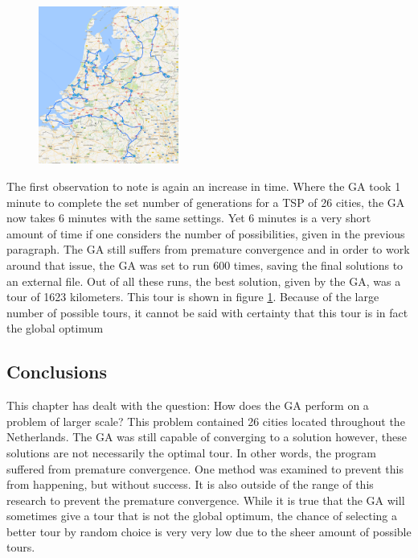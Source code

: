 \begin{figure}
	\vspace{-0.4cm}
	\centering
		\includegraphics[width=0.41\textwidth]{1623tour}	
	\label{1623tour}
\end{figure}

\par
The first observation to note is again an increase in time. Where the GA took 1 minute to complete the set number of generations for a TSP of 26 cities, the GA now takes 6 minutes with the same settings. Yet 6 minutes is a very short amount of time if one considers the number of possibilities, given in the previous paragraph. The GA still suffers from premature convergence and in order to work around that issue, the GA was set to run 600 times, saving the final solutions to an external file. Out of all these runs, the best solution, given by the GA, was a tour of 1623 kilometers. This tour is shown in figure \ref{1623tour}. Because of the large number of possible tours, it cannot be said with certainty that this tour is in fact the global optimum 


\subsection{Conclusions}
\par
This chapter has dealt with the question: How does the GA perform on a problem of larger scale? This problem contained 26 cities located throughout the Netherlands. The GA was still capable of converging to a solution however, these solutions are not necessarily the optimal tour. In other words, the program suffered from premature convergence. One method was examined to prevent this from happening, but without success. It is also outside of the range of this research to prevent the premature convergence. While it is true that the GA will sometimes give a tour that is not the global optimum, the chance of selecting a better tour by random choice is very very low due to the sheer amount of possible tours. 

